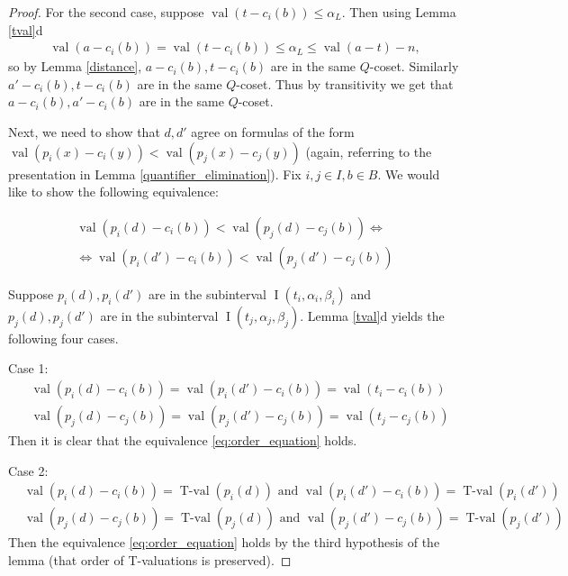 \documentclass{amsart}
\DeclareMathOperator{\val}{val}
\DeclareMathOperator{\vval}{val}
\DeclareMathOperator{\tval}{T-val}
\DeclareMathOperator{\inti}{I}
\begin{document}
\begin{proof}
  For the second case, suppose $\val(t - c_i(b)) \leq \alpha_L$.
  Then using Lemma \ref{tval}d
  \begin{align*}
    \val(a - c_i(b)) = \val(t - c_i(b)) \leq \alpha_L \leq \val(a - t) - n,
  \end{align*}
  so by Lemma \ref{distance}, $a - c_i(b), t - c_i(b)$ are in the same $Q$-coset.
  Similarly $a' - c_i(b), t - c_i(b)$ are in the same $Q$-coset.
  Thus by transitivity we get that $a - c_i(b), a' - c_i(b)$ are in the same $Q$-coset.

  Next, we need to show that $d, d'$ agree on formulas of the form
  $\vval (p_i(x) - c_i(y)) < \vval (p_j(x) - c_j(y))$ 
  (again, referring to the presentation in Lemma \ref{quantifier_elimination}).
  Fix $i,j \in I, b \in B$.
  We would like to show the following equivalence: 

  \begin{multline} \label {eq:order_equation}
    \vval (p_i(d) - c_i(b)) < \vval (p_j(d) - c_j(b)) \iff \\
    \iff \vval (p_i(d') - c_i(b)) < \vval (p_j(d') - c_j(b))
  \end{multline}

  Suppose $p_i(d), p_i(d')$ are in the subinterval $\inti(t_i, \alpha_i, \beta_i)$ and 
  $p_j(d), p_j(d')$ are in the subinterval $\inti(t_j, \alpha_j, \beta_j)$.
  Lemma \ref{tval}d yields the following four cases.

  Case 1:
  \begin{align*}
    &\vval (p_i(d) - c_i(b)) = \vval (p_i(d') - c_i(b)) = \vval(t_i - c_i(b)) \\
    &\vval (p_j(d) - c_j(b)) = \vval (p_j(d') - c_j(b)) = \vval(t_j - c_j(b))
  \end{align*}
  Then it is clear that the equivalence \eqref{eq:order_equation} holds.

  Case 2:
  \begin{align*}
    &\vval (p_i(d) - c_i(b)) = \tval(p_i(d)) \text{ and } \vval (p_i(d') - c_i(b)) = \tval(p_i(d')) \\
    &\vval (p_j(d) - c_j(b)) = \tval(p_j(d)) \text{ and } \vval (p_j(d') - c_j(b)) = \tval(p_j(d'))
  \end{align*}
  Then the equivalence \eqref{eq:order_equation} holds by the third hypothesis of the lemma (that order of T-valuations is preserved).


\end{proof}
\end{document}
